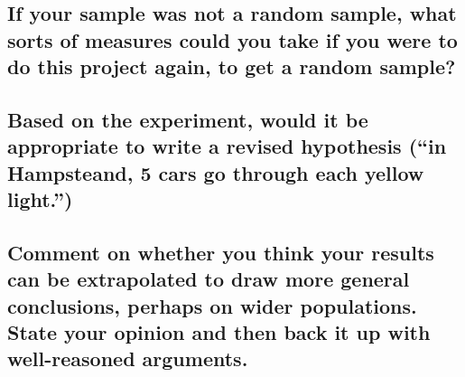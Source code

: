 \documentclass[11pt]{article}
\begin{document}
\hypertarget{if-your-sample-was-not-a-random-sample-what-sorts-of-measures-could-you-take-if-you-were-to-do-this-project-again-to-get-a-random-sample}{%
\subsection{If your sample was not a random sample, what sorts of
measures could you take if you were to do this project again, to get a
random
sample?}\label{if-your-sample-was-not-a-random-sample-what-sorts-of-measures-could-you-take-if-you-were-to-do-this-project-again-to-get-a-random-sample}}

\hypertarget{based-on-the-experiment-would-it-be-appropriate-to-write-a-revised-hypothesis-in-hampsteand-5-cars-go-through-each-yellow-light.}{%
\subsection{Based on the experiment, would it be appropriate to write a
revised hypothesis (``in Hampsteand, 5 cars go through each yellow
light.'')}\label{based-on-the-experiment-would-it-be-appropriate-to-write-a-revised-hypothesis-in-hampsteand-5-cars-go-through-each-yellow-light.}}

\hypertarget{comment-on-whether-you-think-your-results-can-be-extrapolated-to-draw-more-general-conclusions-perhaps-on-wider-populations.-state-your-opinion-and-then-back-it-up-with-well-reasoned-arguments.}{%
\subsection{Comment on whether you think your results can be
extrapolated to draw more general conclusions, perhaps on wider
populations. State your opinion and then back it up with well-reasoned
arguments.}\label{comment-on-whether-you-think-your-results-can-be-extrapolated-to-draw-more-general-conclusions-perhaps-on-wider-populations.-state-your-opinion-and-then-back-it-up-with-well-reasoned-arguments.}}


    
    
    
\end{document}
